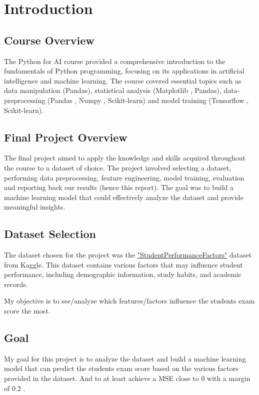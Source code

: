 \documentclass{assignment}
\date{\today}
\begin{document}
\pagecolor{white!30}
\tableofcontents

\newpage
\section{Introduction}
\subsection{Course Overview}
The Python for AI course provided a comprehensive introduction to the fundamentals of Python programming, focusing on its applications in artificial intelligence and machine learning. The course covered essential topics such as data manipulation (Pandas), statistical analysis (Matplotlib , Pandas), data-preprocessing (Pandas , Numpy , Scikit-learn) and model training (Tensorflow , Scikit-learn).

\subsection{Final Project Overview}
The final project aimed to apply the knowledge and skills acquired throughout the course to a dataset of choice. 
The project involved selecting a dataset, performing data preprocessing, feature engineering, model training, evaluation and reporting back our results (hence this report). 
The goal was to build a machine learning model that could effectively analyze the dataset and provide meaningful insights.

\subsection{Dataset Selection}
The dataset chosen for the project was the \href{"https://www.kaggle.com/datasets/lainguyn123/student-performance-factors"}{"StudentPerformanceFactors"}
dataset from Kaggle. This dataset contains various factors that may influence student performance, including demographic information, study habits, and academic records. 

My objective is to see/analyze which features/factors influence the students exam score the most.

\subsection{Goal}
My goal for this project is to analyze the dataset and build a machine learning model that can predict the students exam score based on the various factors provided in the dataset.
And to at least achieve a MSE close to 0 with a margin of 0.2 .
\end{document}
